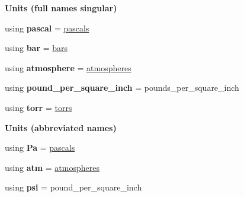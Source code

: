\begin{Indent}{\bf Units (full names singular)}\par
\begin{DoxyCompactItemize}
\item 
\hypertarget{namespaceunits_1_1pressure_a9a13cfc6eb6dfaf8b97206ca1529762c}{}using {\bfseries pascal} = \hyperlink{structunits_1_1unit}{pascals}\label{namespaceunits_1_1pressure_a9a13cfc6eb6dfaf8b97206ca1529762c}

\item 
\hypertarget{namespaceunits_1_1pressure_a1dde308892ce528abafb5739764a77e6}{}using {\bfseries bar} = \hyperlink{structunits_1_1unit}{bars}\label{namespaceunits_1_1pressure_a1dde308892ce528abafb5739764a77e6}

\item 
\hypertarget{namespaceunits_1_1pressure_a0a147531ffb450318672b8d40d8fea5a}{}using {\bfseries atmosphere} = \hyperlink{structunits_1_1unit}{atmospheres}\label{namespaceunits_1_1pressure_a0a147531ffb450318672b8d40d8fea5a}

\item 
\hypertarget{namespaceunits_1_1pressure_ac8acdd7de08cb678f1d30060e5b1c851}{}using {\bfseries pound\+\_\+per\+\_\+square\+\_\+inch} = pounds\+\_\+per\+\_\+square\+\_\+inch\label{namespaceunits_1_1pressure_ac8acdd7de08cb678f1d30060e5b1c851}

\item 
\hypertarget{namespaceunits_1_1pressure_a2e2a9faa0499846d116bd04f39823c85}{}using {\bfseries torr} = \hyperlink{structunits_1_1unit}{torrs}\label{namespaceunits_1_1pressure_a2e2a9faa0499846d116bd04f39823c85}

\end{DoxyCompactItemize}
\end{Indent}
\begin{Indent}{\bf Units (abbreviated names)}\par
\begin{DoxyCompactItemize}
\item 
\hypertarget{namespaceunits_1_1pressure_a01a50d25847fec5b4404bffe5e94c179}{}using {\bfseries Pa} = \hyperlink{structunits_1_1unit}{pascals}\label{namespaceunits_1_1pressure_a01a50d25847fec5b4404bffe5e94c179}

\item 
\hypertarget{namespaceunits_1_1pressure_aeddc87fb7bf651e6f6fac5f9dd4d6be2}{}using {\bfseries atm} = \hyperlink{structunits_1_1unit}{atmospheres}\label{namespaceunits_1_1pressure_aeddc87fb7bf651e6f6fac5f9dd4d6be2}

\item 
\hypertarget{namespaceunits_1_1pressure_a5c6b702256444e63b2f4b41b1b42aaf6}{}using {\bfseries psi} = pound\+\_\+per\+\_\+square\+\_\+inch\label{namespaceunits_1_1pressure_a5c6b702256444e63b2f4b41b1b42aaf6}

\end{DoxyCompactItemize}
\end{Indent}
